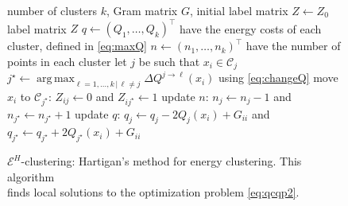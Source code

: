 \documentclass[aps,preprint,nofootinbib,floatfix]{revtex4-1}
\DeclareMathOperator*{\argmax}{arg\,max}
\newcommand\C{{\mathcal{C}}}
\begin{document}
\begin{figure}
\begin{flushleft}
\begin{algorithm}[H]
\vspace{.5em}
\begin{algorithmic}[1]
    \INPUT number of clusters $k$, Gram matrix $G$, 
                initial label matrix $Z \leftarrow Z_0$
    \OUTPUT label matrix $Z$
  \STATE $q \leftarrow (Q_1, \dotsc, Q_k)^\top$ 
            have the energy costs of each cluster, defined in \eqref{eq:maxQ}
  \STATE $n \leftarrow (n_1,\dotsc,n_k)^\top$ have the number of points 
        in each cluster%
  \REPEAT
        \STATE let $j$ be such that $x_i \in \C_j$
        \STATE $j^\star \leftarrow \argmax_{\ell=1,\dotsc,k \, | \, \ell\ne j} 
                \Delta Q^{j\to \ell}(x_i)$
            using \eqref{eq:changeQ} \label{stepmove}
            \STATE move $x_i$ to $\C_{j^\star}$: $Z_{ij} \leftarrow 0$ and 
            $Z_{ij^\star} \leftarrow 1$
            \STATE update $n$: $n_j \leftarrow n_j - 1$ and
                    $n_{j^\star} \leftarrow n_{j^\star} + 1$
            \STATE update $q$: $q_j \leftarrow q_j - 2Q_j(x_i) + G_{ii}$ and
    $q_{j^\star} \leftarrow q_{j^\star} + 2Q_{j^\star}(x_i)+ G_{ii}$
        \ENDIF
    \ENDFOR
\end{algorithmic}
\caption{\label{algo}
$\mathcal{E}^H$-clustering: Hartigan's method for energy clustering.
This algorithm~~~~~~~~ \\ finds local solutions to  
the optimization problem \eqref{eq:qcqp2}.\hspace{\fill}
\hspace{\fill}
}
\end{algorithm}
\end{flushleft}
\end{figure}
\end{document}
